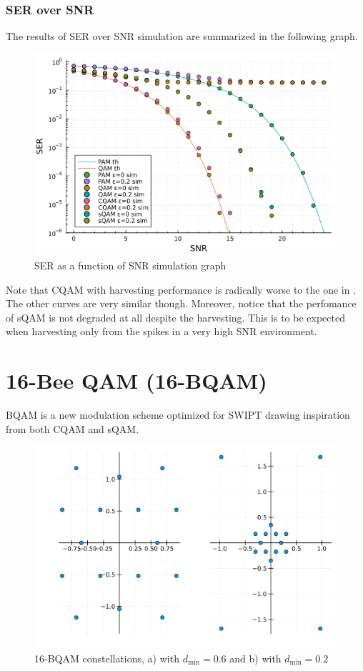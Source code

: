 \documentclass[11pt,a4paper,onecolumn,final]{article}
\newcommand{\dmin}{d_\text{min}}
\begin{document}
\subsubsection*{SER over SNR}
The results of SER over SNR simulation are summarized in the following graph.  
\begin{figure}[h]
    \centering
    \includegraphics[scale=0.59]{ex2_b.png}
    \caption{SER as a function of SNR simulation graph}
\end{figure}

Note that CQAM with harvesting performance is radically worse to the one in \cite{cqam}. The other curves are very similar though. Moreover, notice that the perfomance of sQAM is not degraded at all despite the harvesting. This is to be expected when harvesting only from the spikes in a very high SNR environment. 

\section{16-Bee QAM (16-BQAM)}
BQAM is a new modulation scheme optimized for SWIPT drawing inspiration from both CQAM and sQAM. 
\begin{figure}[h]
    \centering
    \includegraphics[scale=0.57]{bqam_both.png}
    \caption{16-BQAM constellations, a) with \(\dmin = 0.6\) and b) with \(\dmin = 0.2\)}
\end{figure}
\end{document}
